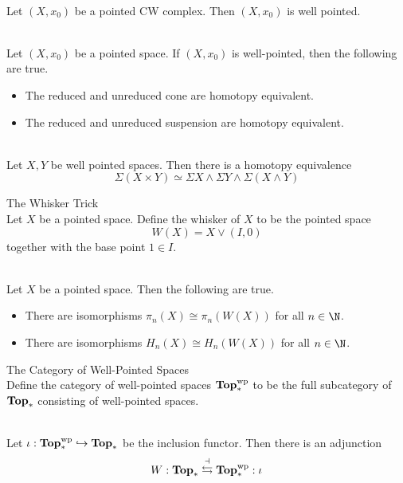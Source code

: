 \documentclass[a4paper]{article}
\begin{document}
\begin{eg}{}{}\\
Let $(X,x_0)$ be a pointed CW complex. Then $(X,x_0)$ is well pointed. 
\end{eg}

\begin{prp}{}{}\\
Let $(X,x_0)$ be a pointed space. If $(X,x_0)$ is well-pointed, then the following are true. 
\begin{itemize}
\item The reduced and unreduced cone are homotopy equivalent. 
\item The reduced and unreduced suspension are homotopy equivalent. 
\end{itemize}
\end{prp}

\begin{prp}{}{}\\
Let $X,Y$ be well pointed spaces. Then there is a homotopy equivalence $$\Sigma(X\times Y)\simeq\Sigma X\wedge\Sigma Y\wedge\Sigma(X\wedge Y)$$
\end{prp}

\begin{defn}{The Whisker Trick}{}\\
Let $X$ be a pointed space. Define the whisker of $X$ to be the pointed space $$W(X)=X\vee(I,0)$$ together with the base point $1\in I$. 
\end{defn}

\begin{lmm}{}{}\\
Let $X$ be a pointed space. Then the following are true. 
\begin{itemize}
\item There are isomorphisms $\pi_n(X)\cong\pi_n(W(X))$ for all $n\in\N$. 
\item There are isomorphisms $H_n(X)\cong H_n(W(X))$ for all $n\in\N$. 
\end{itemize}
\end{lmm}

\begin{defn}{The Category of Well-Pointed Spaces}{}\\
Define the category of well-pointed spaces $\bold{Top}_\ast^\text{wp}$ to be the full subcategory of $\bold{Top}_\ast$ consisting of well-pointed spaces. 
\end{defn}

\begin{prp}{}{}\\
Let $\iota:\bold{Top}_\ast^\text{wp}\hookrightarrow\bold{Top}_\ast$ be the inclusion functor. Then there is an adjunction $$W:\bold{Top}_\ast\overset{\dashv}{\leftrightarrows}\bold{Top}_\ast^\text{wp}:\iota$$
\end{prp}
\end{document}
